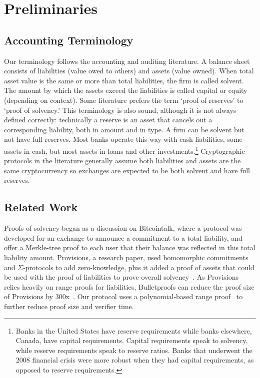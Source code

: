 \chapter{Preliminaries}

\section{Accounting Terminology}

Our terminology follows the accounting and auditing literature. A balance sheet consists of liabilities (value owed to others) and assets (value owned). When total asset value is the same or more than total liabilities, the firm is called solvent. The amount by which the assets exceed the liabilities is called capital or equity (depending on context). Some literature prefers the term `proof of reserves' to `proof of solvency.' This terminology is also sound, although it is not always defined correctly: technically a reserve is an asset that cancels out a corresponding liability, both in amount and in type. A firm can be solvent but not have full reserves. Most banks operate this way with cash liabilities, some assets in cash, but most assets in loans and other investments.\footnote{Banks in the United States have reserve requirements while banks elsewhere, \eg Canada, have capital requirements. Capital requirements speak to solvency, while reserve requirements speak to reserve ratios. Banks that underwent the 2008 financial crisis were more robust when they had capital requirements, as opposed to reserve requirements.} Cryptographic protocols in the literature generally assume both liabilities and assets are the same cryptocurrency so exchanges are expected to be both solvent and have full reserves.

\section{Related Work}
\label{sec:rw}



Proofs of solvency began as a discussion on Bitcointalk, where a protocol was developed for an exchange to announce a commitment to a total liability, and offer a Merkle-tree proof to each user that their balance was reflected in this total liability amount. Provisions, a research paper, used homomorphic commitments and $\Sigma$-protocols to add zero-knowledge, plus it added a proof of assets that could be used with the proof of liabilities to prove overall solvency~\cite{provisions}. As Provisions relies heavily on range proofs for liabilities, Bulletproofs can reduce the proof size of Provisions by 300x~\cite{bulletproofs}. Our protocol uses a polynomial-based range proof~\cite{rangeproof} to further reduce proof size and verifier time.

